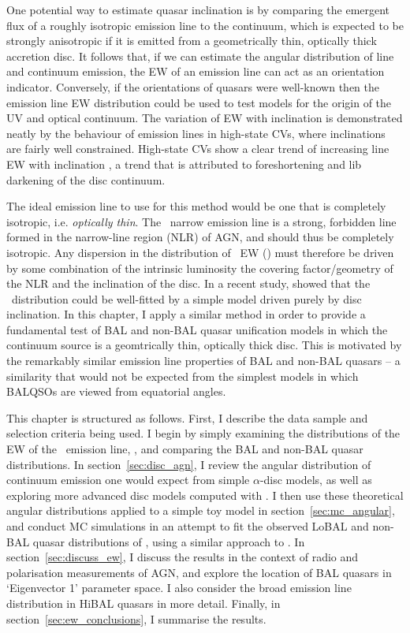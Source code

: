 One potential way to estimate quasar inclination is by comparing
the emergent flux of a roughly isotropic emission line to the continuum, which is
expected to be strongly anisotropic if it is emitted from a geometrically thin, 
optically thick accretion disc. 
It follows that, if we can estimate the angular distribution of line and continuum emission,
the EW of an emission line can act as an orientation indicator. Conversely, if the orientations
of quasars were well-known then the emission line EW distribution could be used to test models
for the origin of the UV and optical continuum.
The variation of EW with inclination is demonstrated neatly by the behaviour 
of emission lines in high-state CVs, where inclinations are fairly well constrained.
High-state CVs show a clear trend of increasing line EW with inclination 
\citep[][see also sections~\ref{sec:NLs} and \ref{sec:modela_spectra}]{hessman1984,patterson1984,echevarria1988,noebauer},
a trend that is attributed to foreshortening and lib darkening of the disc continuum.

The ideal emission line to use for this method would be one that is completely isotropic,
i.e. {\em optically thin}. The \oiiifull\ narrow emission line is a strong, forbidden line
formed in the narrow-line region (NLR) of AGN, and should thus be completely isotropic.
Any dispersion in the distribution of \oiiifull\ EW (\ewo) must therefore be driven by some combination of
the intrinsic luminosity \citep{borosongreen} 
the covering factor/geometry of the NLR \citep{baskin2005} and the 
inclination of the disc. In a recent study, \citet{risaliti2011} showed that 
the \ewo\ distribution could be well-fitted by a simple model driven purely by disc inclination.
In this chapter, I apply a similar method in order to provide a fundamental test of
BAL and non-BAL quasar unification models in which the continuum source is a geomtrically
thin, optically thick disc. This is motivated by the remarkably similar
emission line properties of BAL and non-BAL quasars -- a similarity that would not
be expected from the simplest models in which BALQSOs are viewed from equatorial angles.

This chapter is structured as follows. First, I describe
the data sample and selection criteria being used. I begin by
simply examining the distributions of the EW of the \oiiifull\ emission line,
\ewo, and comparing the BAL and non-BAL quasar distributions. 
In section~\ref{sec:disc_agn}, I review the angular distribution of 
continuum emission one would expect from simple $\alpha$-disc models, 
as well as exploring more advanced disc models computed
with \agn. I then use these theoretical 
angular distributions applied to a simple toy model in 
section~\ref{sec:mc_angular}, and conduct MC simulations in an attempt to fit 
the observed LoBAL and non-BAL quasar distributions of \ewo, using a similar approach to 
\cite{risaliti2011}. In section~\ref{sec:discuss_ew}, I discuss the results
in the context of radio and polarisation measurements of AGN,
and explore the location of BAL quasars in `Eigenvector 1' parameter space.
I also consider the broad emission line distribution in HiBAL quasars in more detail. 
Finally, in section~\ref{sec:ew_conclusions}, I summarise the results.


